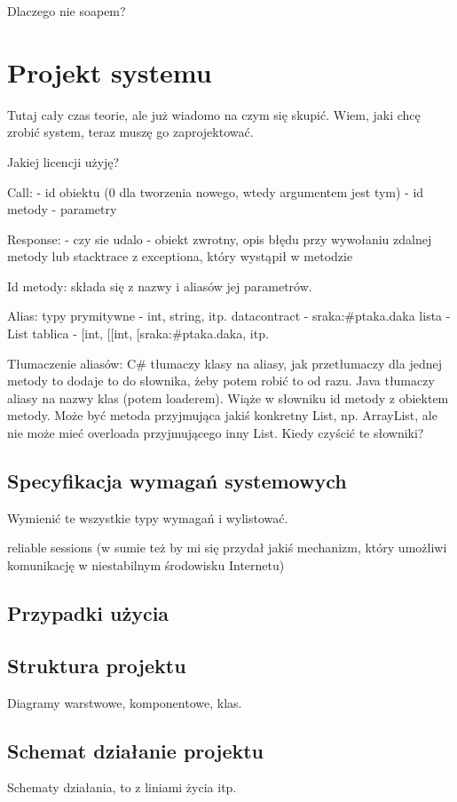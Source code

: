 \documentclass[twoside,a4paper]{book}
\begin{document}
Dlaczego nie soapem?

\chapter{Projekt systemu}
Tutaj cały czas teorie, ale już wiadomo na czym się skupić. Wiem, jaki chcę zrobić system, teraz muszę go zaprojektować.

Jakiej licencji użyję?

Call:
- id obiektu (0 dla tworzenia nowego, wtedy argumentem jest tym)
- id metody
- parametry

Response:
- czy sie udalo
- obiekt zwrotny, opis błędu przy wywołaniu zdalnej metody lub stacktrace z exceptiona, który wystąpił w metodzie

Id metody:
składa się z nazwy i aliasów jej parametrów.

Alias:
typy prymitywne - int, string, itp.
datacontract - sraka:\#ptaka.daka
lista - List
tablica - [int, [[int, [sraka:\#ptaka.daka, itp.

Tłumaczenie aliasów:
C\# tłumaczy klasy na aliasy, jak przetłumaczy dla jednej metody to dodaje to do słownika, żeby potem robić to od razu.
Java tłumaczy aliasy na nazwy klas (potem loaderem). Wiąże w słowniku id metody z obiektem metody. Może być metoda przyjmująca jakiś konkretny List, np. ArrayList, ale nie może mieć overloada przyjmującego inny List.
Kiedy czyścić te słowniki?

\section{Specyfikacja wymagań systemowych}
Wymienić te wszystkie typy wymagań i wylistować.

reliable sessions (w sumie też by mi się przydał jakiś mechanizm, który umożliwi komunikację w niestabilnym środowisku Internetu)

\section{Przypadki użycia}

\section{Struktura projektu}
Diagramy warstwowe, komponentowe, klas.

\section{Schemat działanie projektu}
Schematy działania, to z liniami życia itp.
\end{document}
